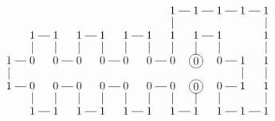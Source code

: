 %
\[
\xymatrix@C=1em@R=1em{
			&				&				&			  &				&			&			&1\ar@{-}[d]&	1\ar@{-}[l]	&	1\ar@{-}[l]	&	1\ar@{-}[l]	&	1\ar@{-}[l]\\
			& 1\ar@{-}[d]	& 1\ar@{-}[l]	& 1\ar@{-}[d] & 1\ar@{-}[l]	&1\ar@{-}[d]&1\ar@{-}[l]&1\ar@{-}[d]&	1\ar@{-}[r]	&	1\ar@{-}[d]	&	&	1\ar@{-}[u]\\
1\ar@{-}[d]	& 0\ar@{-}[l]	& 0\ar@{-}[u]	& 0\ar@{-}[l] & 0\ar@{-}[u]	&0\ar@{-}[l]&0\ar@{-}[u]&0\ar@{-}[l]&	*+[Fo]{0}\ar@{-}[u]	&	0\ar@{-}[r]	&	1\ar@{-}[d]	&	1\ar@{-}[u]\\
1\ar@{-}[r]	& 0\ar@{-}[d]	& 0\ar@{-}[r]	& 0\ar@{-}[d] & 0\ar@{-}[r]	&0\ar@{-}[d]&0\ar@{-}[r]&0\ar@{-}[d]&	*+[Fo]{0}		&	0\ar@{-}[d]	&	1\ar@{-}[l]	&	1\ar@{-}[u]\\
			& 1\ar@{-}[r]	& 1\ar@{-}[u]	& 1\ar@{-}[r] & 1\ar@{-}[u] &1\ar@{-}[r]&1\ar@{-}[u]&1\ar@{-}[r]&	1\ar@{-}[u]	&	1\ar@{-}[r]	&	1\ar@{-}[r]	&	1\ar@{-}[u]\\
}
\]
